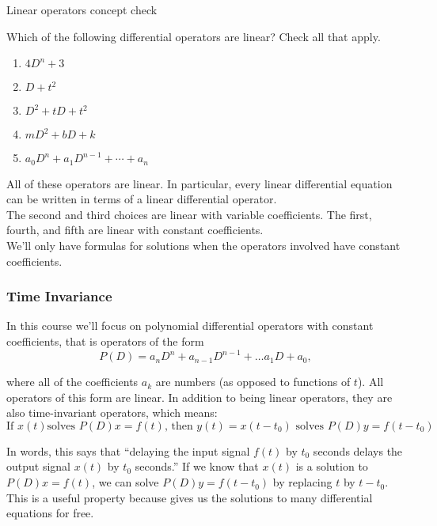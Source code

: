 \begin{exercise}
  Linear operators concept check
\end{exercise}
Which of the following differential operators are linear? Check all that apply.
\begin{enumerate}
\item $4D ^n + 3$
\item $D + t ^2$
\item $D ^2 + tD + t ^2$
\item $mD ^2 + bD + k$
\item $a_0D^ n + a_1D^{n-1} + \cdots + a_ n$
\end{enumerate}

All of these operators are linear.
In particular, every linear differential equation can be written in terms of a linear differential operator.\\

The second and third choices are linear with variable coefficients.
The first, fourth, and fifth are linear with constant coefficients.\\

We'll only have formulas for solutions when the operators involved have constant coefficients.
\clearpage

\subsubsection{Time Invariance}
In this course we'll focus on polynomial differential operators with constant coefficients,
that is operators of the form
\begin{equation*}
  \displaystyle  P\left(D\right)=a_ nD^ n+a_{n-1}D^{n-1}+\dots a_1D+a_0,
\end{equation*}

where all of the coefficients $a_k$ are numbers (as opposed to functions of $t$).
All operators of this form are linear.
In addition to being linear operators, they are also {\color{blue}time-invariant} operators, which means:
\begin{equation*}
  \text{If } x(t) \text{solves } P\left(D\right)x=f\left(t\right), \,
  \text{then } y\left(t\right)=x\left(t-t_0\right) \text{ solves }
  P\left(D\right)y=f\left(t-t_0\right)
\end{equation*}

In words, this says that ``delaying the input signal $f(t)$ by $t_0$
seconds delays the output signal $x(t)$ by $t_0$ seconds.''
If we know that $x(t)$ is a solution to $P\left(D\right)x=f\left(t\right)$,
we can solve $P\left(D\right)y=f\left(t-t_{0}\right)$ by replacing $t$ by $t - t_ 0$.
This is a useful property because gives us the solutions to many differential equations for free.

